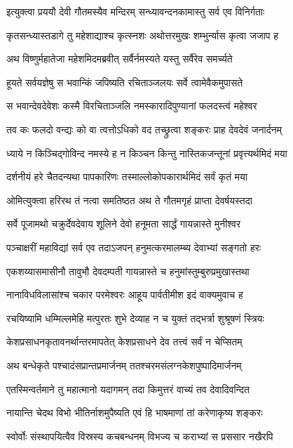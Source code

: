\twolineshloka
{इत्युक्त्वा प्रययौ देवी गौतमस्यैव मन्दिरम्}
{सन्ध्यावन्दनकामास्तु सर्व एव विनिर्गताः}%

\twolineshloka
{कृतसन्ध्यास्तडागे तु महेशाद्याश्च कृत्स्नशः}
{अथोत्तरमुखः शम्भुर्न्यास कृत्वा जजाप ह}%

\twolineshloka
{अथ विष्णुर्महातेजा महेशमिदमब्रवीत्}
{सर्वैर्नमस्यते यस्तु सर्वैरेव समर्च्यते}%

\twolineshloka
{हूयते सर्वयज्ञेषु स भवान्किं जपिष्यति}
{रचिताञ्जलयः सर्वे त्वामेवैकमुपासते}%

\twolineshloka
{स भवान्देवदेवेशः कस्मै विरचिताञ्जलि}
{नमस्कारादिपुण्यानां फलदस्त्वं महेश्वर}%

\twolineshloka
{तव कः फलदो वन्द्यः को वा त्वत्तोऽधिको वद}
{तच्छ्रुत्वा शङ्करः प्राह देवदेवं जनार्दनम्}%

\twolineshloka
{ध्याये न किञ्चिद्गोविन्द नमस्ये ह न किञ्चन}
{किन्तु नास्तिकजन्तूनां प्रवृत्त्यर्थमिदं मया}%

\twolineshloka
{दर्शनीयं हरे चैतदन्यथा पापकारिणः}
{तस्माल्लोकोपकारार्थमिदं सर्वं कृतं मया}%

\twolineshloka
{ओमित्युक्त्वा हरिरथ तं नत्वा समतिष्ठत}
{अथ ते गौतमगृहं प्राप्ता देवर्षयस्तदा}%

\twolineshloka
{सर्वे पूजामथो चक्रुर्देवदेवाय शूलिने}
{देवो हनूमता सार्द्धं गायन्नास्ते मुनीश्वर}%

\twolineshloka
{पञ्चाक्षरीं महाविद्यां सर्व एव तदाऽजपन्}
{हनुमत्करमालम्ब्य देवाभ्यां सङ्गतो हरः}%

\twolineshloka
{एकशय्यासमासीनौ तावुभौ देवदम्पती}
{गायन्नास्ते च हनुमांस्तुम्बुरुप्रमुखास्तथा}%

\twolineshloka
{नानाविधविलासांश्च चकार परमेश्वरः}
{आहूय पार्वतीमीश इदं वाक्यमुवाच ह}%

\twolineshloka
{रचयिष्यामि धम्मिल्लमेहि मत्पुरतः शुभे}
{देव्याह न च युक्तं तद्भर्त्रा शुश्रूषणं स्त्रियः}%

\twolineshloka
{केशप्रसाधनकृतावनर्थान्तरमापतेत्}
{केशप्रसाधने देव तत्त्वं सर्वं न चेप्सितम्}%

\twolineshloka
{अथ बन्धेकृते पश्चादंसप्रान्तप्रमार्जनम्}
{ततश्चरमसंलग्नकेशपुष्पादिमार्जनम्}%

\twolineshloka
{एतस्मिन्वर्तमाने तु महात्मानो यदागमन्}
{तदा किमुत्तरं वाच्यं तव देवादिवन्दित}%

\twolineshloka
{नायान्ति चेदथ विभो भीतिर्नाशमुपैष्यति}
{एवं हि भाषमाणां तां करेणाकृष्य शङ्करः}%

\twolineshloka
{स्वोर्वोः संस्थापयित्वैव विस्रस्य कचबन्धनम्}
{विभज्य च कराभ्यां स प्रससार नखैरपि}%

